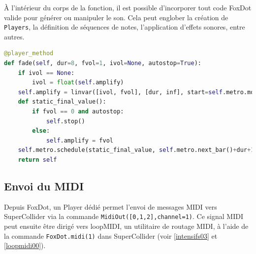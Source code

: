 À l'intérieur du corps de la fonction, il est possible d'incorporer tout code FoxDot valide pour générer ou manipuler le son. Cela peut englober la création de \lstinline{Players}, la définition de séquences de notes, l'application d'effets sonores, entre autres.

\begin{minipage}{\linewidth}
\begin{lstlisting}[language=Python, caption=Écrire ses propres fonctions,captionpos=b,frame=single]
@player_method
def fade(self, dur=8, fvol=1, ivol=None, autostop=True):
    if ivol == None:
        ivol = float(self.amplify)
    self.amplify = linvar([ivol, fvol], [dur, inf], start=self.metro.mod(4))
    def static_final_value():
        if fvol == 0 and autostop:
            self.stop()
        else:
            self.amplify = fvol
    self.metro.schedule(static_final_value, self.metro.next_bar()+dur+1)
    return self
\end{lstlisting}
\end{minipage}


\subsection*{Envoi du MIDI}
Depuis FoxDot, un Player dédié permet l'envoi de messages MIDI vers SuperCollider via la commande \lstinline{MidiOut([0,1,2],channel=1)}. Ce signal MIDI peut ensuite être dirigé vers loopMIDI, un utilitaire de routage MIDI, à l'aide de la commande \lstinline{FoxDot.midi(1)} dans SuperCollider (voir \ref{intensifs03} et \ref{loopmidi00}).

